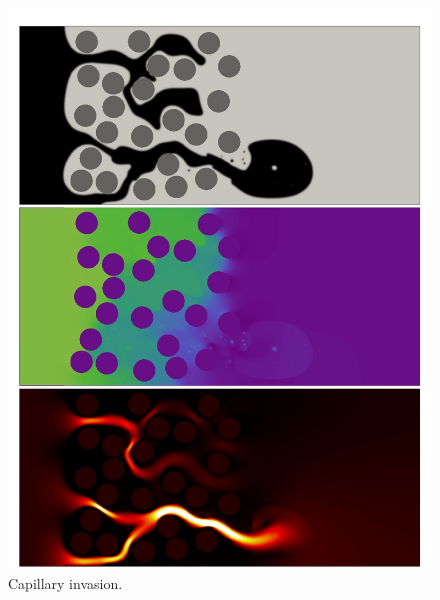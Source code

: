 \documentclass[10pt,handout]{beamer}
\begin{document}
\begin{frame}
\begin{figure}
\begin{minipage}[c]{0.45\textwidth}
    \includegraphics[width=\textwidth]{obrazki_md/invasion/c8.jpg} 
    \caption{Capillary invasion.}
  \end{minipage}
\end{figure}

\end{frame}


\end{document}
